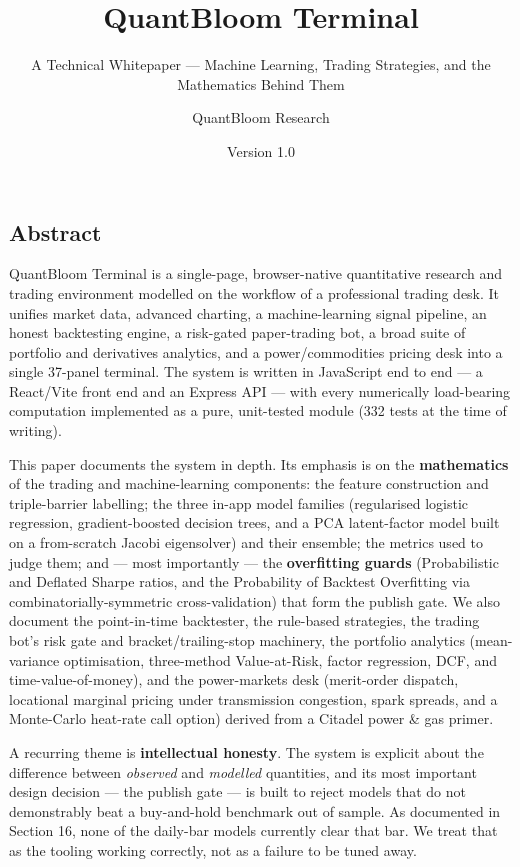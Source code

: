 \documentclass[
  11pt,
]{article}
\title{QuantBloom Terminal}
\subtitle{A Technical Whitepaper --- Machine Learning, Trading
Strategies, and the Mathematics Behind Them}
\author{QuantBloom Research}
\date{Version 1.0}
\newcounter{none} %
\begin{document}
\maketitle

{
\setcounter{tocdepth}{2}
\tableofcontents
}
\subsection{Abstract}\label{abstract}

QuantBloom Terminal is a single-page, browser-native quantitative
research and trading environment modelled on the workflow of a
professional trading desk. It unifies market data, advanced charting, a
machine-learning signal pipeline, an honest backtesting engine, a
risk-gated paper-trading bot, a broad suite of portfolio and derivatives
analytics, and a power/commodities pricing desk into a single 37-panel
terminal. The system is written in JavaScript end to end --- a
React/Vite front end and an Express API --- with every numerically
load-bearing computation implemented as a pure, unit-tested module (332
tests at the time of writing).

This paper documents the system in depth. Its emphasis is on the
\textbf{mathematics} of the trading and machine-learning components: the
feature construction and triple-barrier labelling; the three in-app
model families (regularised logistic regression, gradient-boosted
decision trees, and a PCA latent-factor model built on a from-scratch
Jacobi eigensolver) and their ensemble; the metrics used to judge them;
and --- most importantly --- the \textbf{overfitting guards}
(Probabilistic and Deflated Sharpe ratios, and the Probability of
Backtest Overfitting via combinatorially-symmetric cross-validation)
that form the publish gate. We also document the point-in-time
backtester, the rule-based strategies, the trading bot's risk gate and
bracket/trailing-stop machinery, the portfolio analytics (mean-variance
optimisation, three-method Value-at-Risk, factor regression, DCF, and
time-value-of-money), and the power-markets desk (merit-order dispatch,
locational marginal pricing under transmission congestion, spark
spreads, and a Monte-Carlo heat-rate call option) derived from a Citadel
power \& gas primer.

A recurring theme is \textbf{intellectual honesty}. The system is
explicit about the difference between \emph{observed} and
\emph{modelled} quantities, and its most important design decision ---
the publish gate --- is built to reject models that do not demonstrably
beat a buy-and-hold benchmark out of sample. As documented in Section
16, none of the daily-bar models currently clear that bar. We treat that
as the tooling working correctly, not as a failure to be tuned away.
\end{document}
